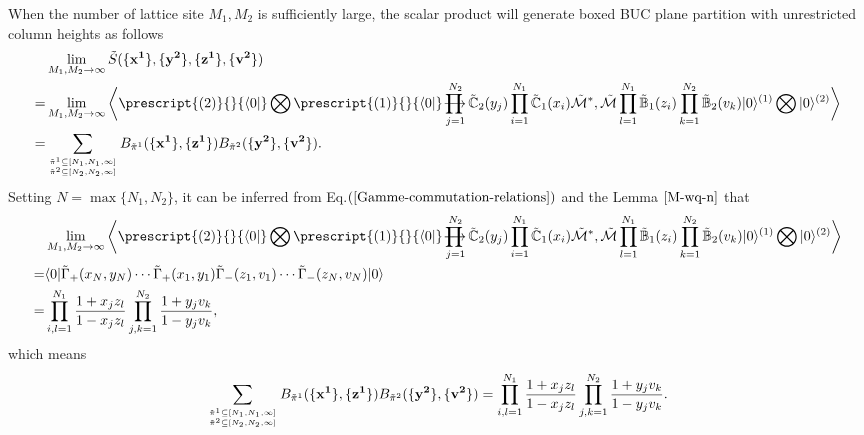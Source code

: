 \documentclass[11pt,reqno]{amsart}
\numberwithin{equation}{section}
\def\rprod{\mathop{\prod{\mkern-28.0mu}{\mathbf\longrightarrow}}}
\begin{document}
	
	When the number of lattice site $M_{1},M_{2}$ is sufficiently large, the scalar product will generate boxed  BUC plane partition with unrestricted column heights as follows
	\begin{align}
		&\lim\limits_{M_{1},M_{2}\to \infty}	
		\tilde{S}(\{\mathbf{x^1}\}, \{\mathbf{y^2}\}, \{\mathbf{z^1}\}, \{\mathbf{v^2}\})\notag\\
		=&\lim\limits_{M_{1},M_{2}\to \infty}
		\bigg \langle \prescript{(2)}{}{\langle 0|}\bigotimes \prescript{(1)}{}{\langle 0|}
		\rprod_{j=1}^{N_2} \tilde{\mathbb{C}}_{2}(y_j)
		\prod_{i=1}^{N_1} \tilde{\mathbb{C}}_{1}(x_i) \tilde{\mathcal{M}}^*
		,\tilde{\mathcal{M}}\prod_{l=1}^{N_1} \tilde{\mathbb{B}}_{1}(z_i)
		\prod_{k=1}^{N_2} \tilde{\mathbb{B}}_{2}(v_k)
		|0\rangle^{(1)}\bigotimes|0\rangle^{(2)} \bigg\rangle\notag\\
		=&
		\sum_{{\tilde{\pi}^{1} \subseteq [N_{1}, N_{1},\infty]}
			\atop{\tilde{\pi}^{2} \subseteq [N_{2}, N_{2}, \infty]}}
		B_{\tilde{\pi}^{1} }(\{\mathbf{x^1}\}, \{\mathbf{z^1}\}) B_{\tilde{\pi}^{2} }(\{\mathbf{y^2}\}, \{\mathbf{v^2}\}).
	\end{align}
	Setting $N=\max\{N_{1},N_{2}\}$,
	it can be inferred from
	Eq.$(\ref{Gamme-commutation-relations})$ and the Lemma $\ref{M-wq-n}$ that
	\begin{align}\label{scalar-product-Gamma1-Gamma2-m-wq}
		&\lim\limits_{M_{1},M_{2}\to \infty}
		\bigg \langle \prescript{(2)}{}{\langle 0|}\bigotimes \prescript{(1)}{}{\langle 0|}
		\rprod_{j=1}^{N_2} \tilde{\mathbb{C}}_{2}(y_j)
		\prod_{i=1}^{N_1} \tilde{\mathbb{C}}_{1}(x_i) \tilde{\mathcal{M}}^*
		,\tilde{\mathcal{M}}\prod_{l=1}^{N_1} \tilde{\mathbb{B}}_{1}(z_i)
		\prod_{k=1}^{N_2} \tilde{\mathbb{B}}_{2}(v_k)
		|0\rangle^{(1)}\bigotimes|0\rangle^{(2)} \bigg\rangle\notag\\
		=&
		\langle 0|
		\tilde{\Gamma}_+(x_{N},y_{N})\cdots\tilde{\Gamma}_+(x_{1},y_{1})
		\tilde{\Gamma}_-(z_1,v_1)\cdots\tilde{\Gamma}_-(z_{N},v_{N})
		|0\rangle\notag\\
		=&	\prod_{i,l=1}^{N_1} \frac{1 +  x_{j}z_{l}}{1 -  x_{j}z_{l}} \prod_{j,k=1}^{N_2} \frac{1 + y_{j} v_{k}}{1 - y_{j} v_{k}},
	\end{align}
	which means
	\begin{align}
		\sum_{{\tilde{\pi}^{1} \subseteq [N_{1}, N_{1},\infty]}
			\atop{\tilde{\pi}^{2} \subseteq [N_{2}, N_{2}, \infty]}}
		B_{\tilde{\pi}^{1} }(\{\mathbf{x^1}\}, \{\mathbf{z^1}\}) B_{\tilde{\pi}^{2} }(\{\mathbf{y^2}\}, \{\mathbf{v^2}\})
		=\prod_{i,l=1}^{N_1} \frac{1 +  x_{j}z_{l}}{1 -  x_{j}z_{l}} \prod_{j,k=1}^{N_2} \frac{1 + y_{j} v_{k}}{1 - y_{j} v_{k}}.
	\end{align}
\end{document}
